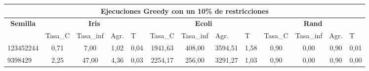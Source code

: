 \documentclass[12pt, spanish]{article}
\begin{document}
\begin{table}[H]

\small

\begin{adjustwidth}{-1cm}{-1cm}%

\begin{tabular}{|l|c|c|c|c|c|c|c|c|c|c|c|c|}
\hline
\multicolumn{13}{|c|}{\textbf{Ejecuciones Greedy con un 10\% de restricciones}}                                                                                                                                                                                                                                                                                                                                        \\ \hline
\multicolumn{1}{|c|}{\multirow{2}{*}{\textbf{Semilla}}} & \multicolumn{4}{c|}{\textbf{Iris}}                                                                                 & \multicolumn{4}{c|}{\textbf{Ecoli}}                                                                                & \multicolumn{4}{c|}{\textbf{Rand}}                                                                                 \\ \cline{2-13} 
\multicolumn{1}{|c|}{}                                  & \multicolumn{1}{l|}{Tasa\_C} & \multicolumn{1}{l|}{Tasa\_inf} & \multicolumn{1}{l|}{Agr.} & \multicolumn{1}{l|}{T} & \multicolumn{1}{l|}{Tasa\_C} & \multicolumn{1}{l|}{Tasa\_inf} & \multicolumn{1}{l|}{Agr.} & \multicolumn{1}{l|}{T} & \multicolumn{1}{l|}{Tasa\_C} & \multicolumn{1}{l|}{Tasa\_inf} & \multicolumn{1}{l|}{Agr.} & \multicolumn{1}{l|}{T} \\ \hline
123452244                                               & 0,71                         & 7,00                           & 1,02                      & 0,04                   & 1941,63                      & 408,00                         & 3594,51                   & 1,58                   & 0,90                         & 0,00                           & 0,90                      & 0,01                   \\ \hline
9398429                                                 & 2,25                         & 47,00                          & 4,36                      & 0,03                   & 2254,17                      & 256,00                         & 3291,27                   & 1,03                   & 0,90                         & 0,00                           & 0,90                      & 0,00                   \\ \hline

\end{tabular}
\end{adjustwidth}
\end{table}
\end{document}
